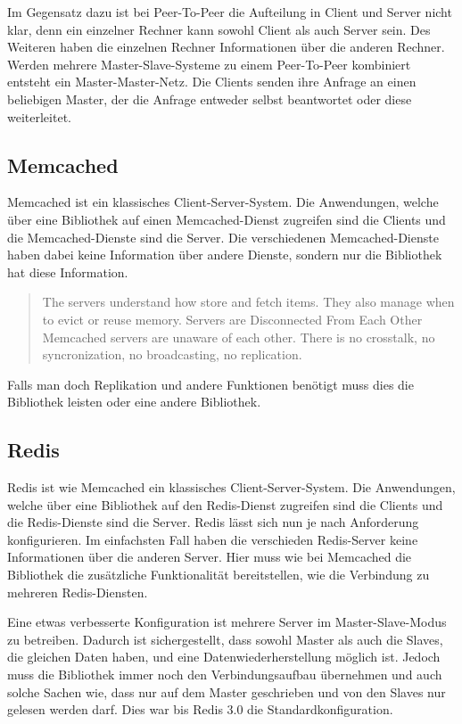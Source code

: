 Im Gegensatz dazu ist bei Peer-To-Peer die Aufteilung in Client und Server
nicht klar, denn ein einzelner Rechner kann sowohl Client als auch Server sein.
Des Weiteren haben die einzelnen Rechner Informationen über die anderen Rechner.
Werden mehrere Master-Slave-Systeme zu einem Peer-To-Peer kombiniert entsteht
ein Master-Master-Netz. Die Clients senden ihre Anfrage an einen beliebigen
Master, der die Anfrage entweder selbst beantwortet oder diese weiterleitet.

\subsection{Memcached}
Memcached ist ein klassisches Client-Server-System. Die Anwendungen, welche über
eine Bibliothek auf einen Memcached-Dienst zugreifen sind die Clients und die
Memcached-Dienste sind die Server. Die verschiedenen Memcached-Dienste haben
dabei keine Information über andere Dienste, sondern nur die Bibliothek hat
diese Information.

\foreignblockquote{english}[\cite{Memcached2017}]{The servers understand how
store and fetch items. They also manage when to evict or reuse memory. Servers
are Disconnected From Each Other Memcached servers are unaware of each other.
There is no crosstalk, no syncronization, no broadcasting, no replication.}

Falls man doch Replikation und andere Funktionen benötigt muss dies die
Bibliothek leisten oder eine andere Bibliothek.

\subsection{Redis}
Redis ist wie Memcached ein klassisches Client-Server-System. Die Anwendungen,
welche über eine Bibliothek auf den Redis-Dienst zugreifen sind die Clients und
die Redis-Dienste sind die Server. Redis lässt sich nun je nach Anforderung
konfigurieren. Im einfachsten Fall haben die verschieden Redis-Server keine
Informationen über die anderen Server. Hier muss wie bei Memcached die
Bibliothek die zusätzliche Funktionalität bereitstellen, wie die Verbindung zu
mehreren Redis-Diensten.

Eine etwas verbesserte Konfiguration ist mehrere Server im Master-Slave-Modus
zu betreiben. Dadurch ist sichergestellt, dass sowohl Master als auch die
Slaves, die gleichen Daten haben, und eine Datenwiederherstellung möglich ist.
Jedoch muss die Bibliothek immer noch den Verbindungsaufbau übernehmen und auch
solche Sachen wie, dass nur auf dem Master geschrieben und von den Slaves nur
gelesen werden darf. Dies war bis Redis 3.0 die Standardkonfiguration.

